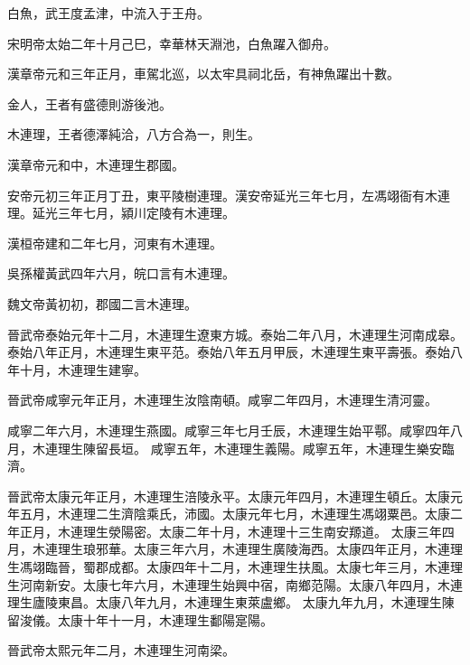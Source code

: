 \begin{pinyinscope}
 白魚，武王度孟津，中流入于王舟。



 宋明帝太始二年十月己巳，幸華林天淵池，白魚躍入御舟。



 漢章帝元和三年正月，車駕北巡，以太牢具祠北岳，有神魚躍出十數。


金人，王者有盛德則游後池。



 木連理，王者德澤純洽，八方合為一，則生。



 漢章帝元和中，木連理生郡國。



 安帝元初三年正月丁丑，東平陵樹連理。漢安帝延光三年七月，左馮翊衙有木連理。延光三年七月，潁川定陵有木連理。



 漢桓帝建和二年七月，河東有木連理。



 吳孫權黃武四年六月，皖口言有木連理。



 魏文帝黃初初，郡國二言木連理。



 晉武帝泰始元年十二月，木連理生遼東方城。泰始二年八月，木連理生河南成皋。
 泰始八年正月，木連理生東平范。泰始八年五月甲辰，木連理生東平壽張。泰始八年十月，木連理生建寧。



 晉武帝咸寧元年正月，木連理生汝陰南頓。咸寧二年四月，木連理生清河靈。



 咸寧二年六月，木連理生燕國。咸寧三年七月壬辰，木連理生始平鄠。咸寧四年八月，木連理生陳留長垣。
 咸寧五年，木連理生義陽。咸寧五年，木連理生樂安臨濟。



 晉武帝太康元年正月，木連理生涪陵永平。太康元年四月，木連理生頓丘。太康元年五月，木連理二生濟陰乘氏，沛國。太康元年七月，木連理生馮翊粟邑。太康二年正月，木連理生滎陽密。太康二年十月，木連理十三生南安羱道。
 太康三年四月，木連理生琅邪華。太康三年六月，木連理生廣陵海西。太康四年正月，木連理生馮翊臨晉，蜀郡成都。太康四年十二月，木連理生扶風。太康七年三月，木連理生河南新安。太康七年六月，木連理生始興中宿，南鄉范陽。太康八年四月，木連理生廬陵東昌。太康八年九月，木連理生東萊盧鄉。
 太康九年九月，木連理生陳留浚儀。太康十年十一月，木連理生鄱陽寔陽。



 晉武帝太熙元年二月，木連理生河南梁。




\end{pinyinscope}

